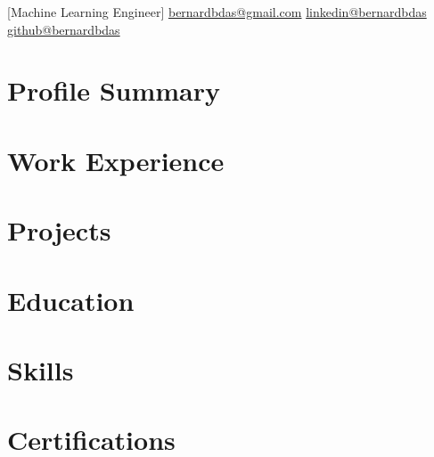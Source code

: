 \documentclass{main}
\begin{document}
[Machine Learning Engineer]{%
  \contactline%
  {\href{mailto:bernardbdas@gmail.com}{bernardbdas@gmail.com}}%
  {\href{https://linkedin.com/in/bernardbdas}{linkedin@bernardbdas}}%
  {\href{https://github.com/bernardbdas}{github@bernardbdas}}%
}


\begin{minipage}[t]{0.65\textwidth}

  \section{Profile Summary}
  
  \sectionsep

  \section{Work Experience}
  
  \sectionsep

  \section{Projects}
  
  \sectionsep

  \section{Education}
  

\end{minipage}%
\hfill
\begin{minipage}[t]{0.32\textwidth}

  \section{Skills}
  
  \sectionsep

  \section{Certifications}
  

\end{minipage}
\end{document}
